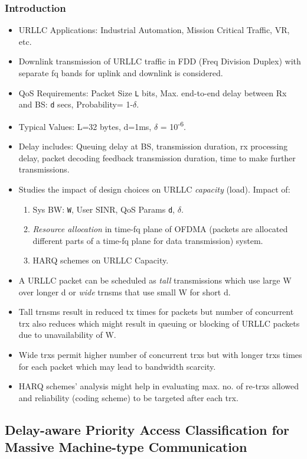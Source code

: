 \documentclass[11pt]{article}
\begin{document}
\subsubsection{Introduction}
\label{sec:org43ef5cf}
\begin{itemize}
\item URLLC Applications: Industrial Automation, Mission Critical Traffic, VR, etc.
\item Downlink transmission of URLLC traffic in FDD (Freq Division Duplex) with separate fq bands for uplink and downlink is considered.
\item QoS Requirements: Packet Size \texttt{L} bits, Max. end-to-end delay between Rx and BS: \texttt{d} secs, Probability= 1-\(\delta\).
\item Typical Values: L=32 bytes, d=1ms, \(\delta\) = 10\textsuperscript{-6}.
\item Delay includes: Queuing delay at BS, transmission duration, rx processing delay, packet decoding feedback transmission duration, time to make further transmissions.
\item Studies the impact of design choices on URLLC \emph{capacity} (load). Impact of:
\begin{enumerate}
\item Sys BW: \texttt{W}, User SINR, QoS Params \texttt{d}, \(\delta\).
\item \emph{Resource allocation} in time-fq plane of OFDMA (packets are allocated different parts of a time-fq plane for data transmission) system.
\item HARQ schemes on URLLC Capacity.
\end{enumerate}
\item A URLLC packet can be scheduled as \emph{tall} transmissions which use large W over longer d or \emph{wide} trnsms that use small W for short d.
\item Tall trnsms result in reduced tx times for packets but number of concurrent trx also reduces which might result in queuing or blocking of URLLC packets due to unavailability of W.
\item Wide trxs permit higher number of concurrent trxs but with longer trxs times for each packet which may lead to bandwidth scarcity.
\item HARQ schemes' analysis might help in evaluating max. no. of re-trxs allowed and reliability (coding scheme) to be targeted after each trx.
\end{itemize}
\subsection{Delay-aware Priority Access Classification for Massive Machine-type Communication}
\label{sec:org037df5d}
\end{document}
